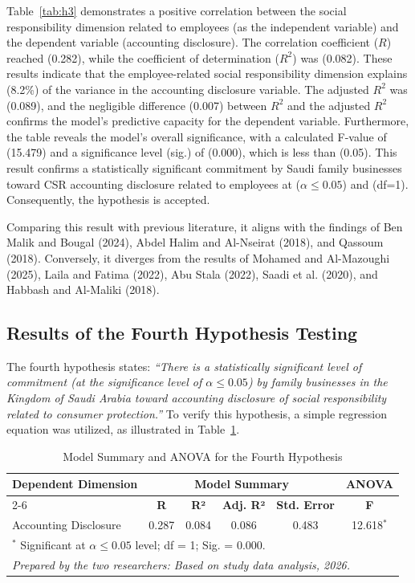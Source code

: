 \documentclass[10pt]{NSP1}
\begin{document}
Table~\ref{tab:h3} demonstrates a positive correlation between the social responsibility dimension related to employees (as the independent variable) and the dependent variable (accounting disclosure). The correlation coefficient ($R$) reached (0.282), while the coefficient of determination ($R^2$) was (0.082). These results indicate that the employee-related social responsibility dimension explains (8.2\%) of the variance in the accounting disclosure variable. The adjusted $R^2$ was (0.089), and the negligible difference (0.007) between $R^2$ and the adjusted $R^2$ confirms the model's predictive capacity for the dependent variable. Furthermore, the table reveals the model's overall significance, with a calculated F-value of (15.479) and a significance level (sig.) of (0.000), which is less than (0.05). This result confirms a statistically significant commitment by Saudi family businesses toward CSR accounting disclosure related to employees at ($\alpha \leq 0.05$) and (df=1). Consequently, the hypothesis is accepted.

Comparing this result with previous literature, it aligns with the findings of Ben Malik and Bougal (2024), Abdel Halim and Al-Nseirat (2018), and Qassoum (2018). Conversely, it diverges from the results of Mohamed and Al-Mazoughi (2025), Laila and Fatima (2022), Abu Stala (2022), Saadi et al. (2020), and Habbash and Al-Maliki (2018).

\subsection{Results of the Fourth Hypothesis Testing}

The fourth hypothesis states: \emph{``There is a statistically significant level of commitment (at the significance level of $\alpha \leq 0.05$) by family businesses in the Kingdom of Saudi Arabia toward accounting disclosure of social responsibility related to consumer protection.''} To verify this hypothesis, a simple regression equation was utilized, as illustrated in Table~\ref{tab:h4}.

\begin{table}[H]
\centering
\caption{Model Summary and ANOVA for the Fourth Hypothesis}
\label{tab:h4}
\vspace{5pt}
\small
\begin{tabular}{lccccc}
\hline
\multirow{2}{*}{\textbf{Dependent Dimension}} & \multicolumn{4}{c}{\textbf{Model Summary}} & \multicolumn{1}{c}{\textbf{ANOVA}} \\
\cline{2-6}
 & \textbf{R} & \textbf{R²} & \textbf{Adj. R²} & \textbf{Std. Error} & \textbf{F} \\
\hline
Accounting Disclosure & 0.287 & 0.084 & 0.086 & 0.483 & 12.618$^{*}$ \\
\hline
\multicolumn{6}{l}{\footnotesize $^{*}$ Significant at $\alpha \leq 0.05$ level; df = 1; Sig. = 0.000.} \\
\multicolumn{6}{l}{\footnotesize \textit{Prepared by the two researchers: Based on study data analysis, 2026.}} \\
\end{tabular}
\end{table}
\end{document}
